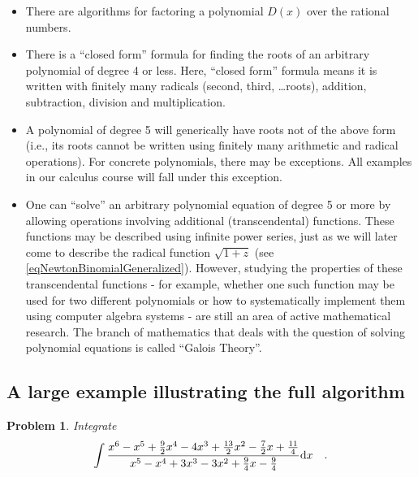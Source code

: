 \documentclass[12pt]{book}
\newtheorem{problem}[theorem]{Problem}
\begin{document}
\begin{itemize}
\item There are algorithms for factoring a polynomial $D(x)$ over the rational numbers.
\item There is a ``closed form'' formula for finding the roots of an arbitrary polynomial of degree 4 or less. Here, ``closed form'' formula means it is written with finitely many radicals (second, third, \dots roots), addition, subtraction, division and multiplication.
\item A polynomial of degree 5 will generically have roots not of the above form (i.e., its roots cannot be written using finitely many arithmetic and radical operations). For concrete polynomials, there may be exceptions. All examples in our calculus course will fall under this exception.
\item One can ``solve'' an arbitrary polynomial equation of degree 5 or more by allowing operations involving additional (transcendental) functions. These functions may be described using infinite power series, just as we will later come to describe the radical function $\sqrt{1+z}$ (see \eqref{eqNewtonBinomialGeneralized}). However, studying the properties of these transcendental functions - for example, whether one such function may be used for two different polynomials or how to systematically implement them using computer algebra systems - are still an area of active mathematical research. The branch of mathematics that deals with the question of solving polynomial equations is called ``Galois Theory''.
\end{itemize}

\subsection{A large example illustrating the full algorithm }


\begin{problem}
Integrate
\[
\int \frac{x^{6}-x^{5}+\frac{9}{2} x^{4}-4 x^{3}+\frac{13}{2} x^{2}-\frac{7}{2} x+\frac{11}{4}}{x^{5}-x^{4}+3 x^{3}-3 x^{2}+\frac{9}{4} x-\frac{9}{4}} {\normalfont \text{d}} x\quad .
\]
\end{problem}
\end{document}

